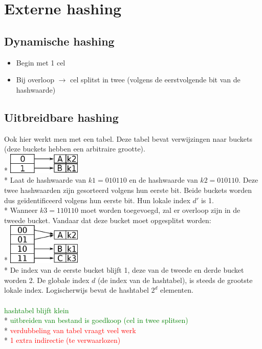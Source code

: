 \documentclass[10pt]{article}
\begin{document}
\section{Externe hashing}
\subsection{Dynamische hashing}
\begin{itemize}
\item Begin met 1 cel
\item Bij overloop $\rightarrow$ cel splitst in twee (volgens de eerstvolgende bit van de hashwaarde)
\end{itemize}
\subsection{Uitbreidbare hashing}
Ook hier werkt men met een tabel. Deze tabel bevat verwijzingen naar buckets (deze buckets hebben een arbitraire grootte).\\*
\includegraphics[width=35mm]{ExtendibleHashing.png}\\*
Laat de hashwaarde van $k1 = 010110$ en de hashwaarde van $k2 = 010110$. Deze twee hashwaarden zijn gesorteerd volgens hun eerste bit. Beide buckets worden dus ge\"identificeerd volgens hun eerste bit. Hun lokale index $d'$ is 1.\\*
Wanneer $k3 = 110110$ moet worden toegevoegd, zal er overloop zijn in de tweede bucket. Vandaar dat deze bucket moet opgesplitst worden:\\*
\includegraphics[width=35mm]{ExtendibleHashing2.png}\\*
De index van de eerste bucket blijft 1, deze van de tweede en derde bucket worden 2. De globale index $d$ (de index van de hashtabel), is steeds de grootste lokale index. Logischerwijs bevat de hashtabel $2^d$ elementen.\\\\
\textcolor{green}{hashtabel blijft klein}\\*
\textcolor{green}{uitbreiden van bestand is goedkoop (cel in twee splitsen)}\\*
\textcolor{red}{verdubbeling van tabel vraagt veel werk}\\*
\textcolor{red}{1 extra indirectie (te verwaarlozen)}
\end{document}
